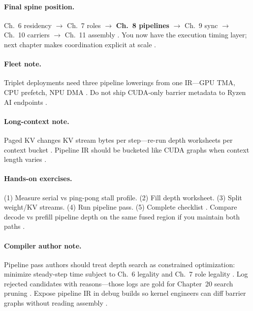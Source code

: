 \paragraph{Final spine position.}
Ch.~6 residency $\rightarrow$ Ch.~7 roles $\rightarrow$ \textbf{Ch.~8 pipelines} $\rightarrow$ Ch.~9 sync $\rightarrow$ Ch.~10 carriers $\rightarrow$ Ch.~11 assembly \citep{dao2022flashattention,mpk2025,semianalysis2024tma,amd2024xdna,wu2024mirage}.
You now have the execution timing layer; next chapter makes coordination explicit at scale \citep{taxbreak2026,patel2025llminference,shah2024flashattention3,yirage2026,chen2020compilerbasedhardw}.

\paragraph{Fleet note.}
Triplet deployments need three pipeline lowerings from one IR---GPU TMA, CPU prefetch, NPU DMA \citep{patel2025llminference,yirage2026,amd2024aie,nvidia2022hopper,chen2020compilerbasedhardw}.
Do not ship CUDA-only barrier metadata to Ryzen AI endpoints \citep{amd2024xdna,taxbreak2026,memoryfloor2026}.

\paragraph{Long-context note.}
Paged KV changes KV stream bytes per step---re-run depth worksheets per context bucket \citep{kwon2023vllm,dao2023flashdecoding,patel2025llminference}.
Pipeline IR should be bucketed like CUDA graphs when context length varies \citep{nvidia2024cudagraphs,yirage2026,shah2024flashattention3}.

\paragraph{Hands-on exercises.}
(1) Measure serial vs ping-pong stall profile. (2) Fill depth worksheet. (3) Split weight/KV streams. (4) Run pipeline pass. (5) Complete checklist \citep{taxbreak2026,shah2024flashattention3,yirage2026,patel2025llminference,mpk2025,amd2024xdna,nvidia2022hopper,semianalysis2024tma,dao2022flashattention,memoryfloor2026,wu2024mirage,nvidia2024cudagraphs,kwon2023vllm,dlbook,chen2020compilerbasedhardw,amd2024aie,dao2023flashdecoding}.
Compare decode vs prefill pipeline depth on the same fused region if you maintain both paths \citep{kwon2023vllm,shah2024flashattention3,taxbreak2026}.

\paragraph{Compiler author note.}
Pipeline pass authors should treat depth search as constrained optimization: minimize steady-step time subject to Ch.~6 legality and Ch.~7 role legality \citep{yirage2026,wu2024mirage,chen2020compilerbasedhardw,mpk2025}.
Log rejected candidates with reasons---those logs are gold for Chapter~20 search pruning \citep{mpk2025,patel2025llminference,taxbreak2026}.
Expose pipeline IR in debug builds so kernel engineers can diff barrier graphs without reading assembly \citep{shah2024flashattention3,semianalysis2024tma,yirage2026}.

